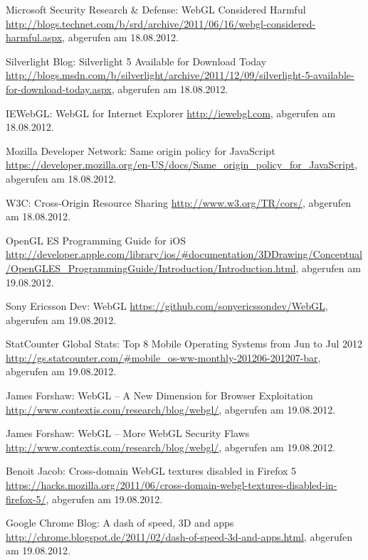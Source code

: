 \begin{thebibliography}{99}
    Microsoft Security Research \& Defense: WebGL Considered Harmful
    \url{http://blogs.technet.com/b/srd/archive/2011/06/16/webgl-considered-harmful.aspx}, abgerufen am 18.08.2012.

    Silverlight Blog: Silverlight 5 Available for Download Today
    \url{http://blogs.msdn.com/b/silverlight/archive/2011/12/09/silverlight-5-available-for-download-today.aspx}, abgerufen am 18.08.2012.

    IEWebGL: WebGL for Internet Explorer
    \url{http://iewebgl.com}, abgerufen am 18.08.2012.

    Mozilla Developer Network: Same origin policy for JavaScript
    \url{https://developer.mozilla.org/en-US/docs/Same_origin_policy_for_JavaScript}, abgerufen am 18.08.2012.

    W3C: Cross-Origin Resource Sharing
    \url{http://www.w3.org/TR/cors/}, abgerufen am 18.08.2012.

    OpenGL ES Programming Guide for iOS
    \url{http://developer.apple.com/library/ios/#documentation/3DDrawing/Conceptual/OpenGLES_ProgrammingGuide/Introduction/Introduction.html}, abgerufen am 19.08.2012.
    
    Sony Ericsson Dev: WebGL
    \url{https://github.com/sonyericssondev/WebGL}, abgerufen am 19.08.2012.
  
    StatCounter Global Stats: Top 8 Mobile Operating Systems from Jun to Jul 2012
    \url{http://gs.statcounter.com/#mobile_os-ww-monthly-201206-201207-bar}, abgerufen am 19.08.2012.


    James Forshaw: WebGL -- A New Dimension for Browser Exploitation
    \url{http://www.contextis.com/research/blog/webgl/}, abgerufen am 19.08.2012.
    
    James Forshaw: WebGL -- More WebGL Security Flaws
    \url{http://www.contextis.com/research/blog/webgl/}, abgerufen am 19.08.2012.

    Benoit Jacob: Cross-domain WebGL textures disabled in Firefox 5
    \url{https://hacks.mozilla.org/2011/06/cross-domain-webgl-textures-disabled-in-firefox-5/}, abgerufen am 19.08.2012.




    Google Chrome Blog: A dash of speed, 3D and apps
    \url{http://chrome.blogspot.de/2011/02/dash-of-speed-3d-and-apps.html}, abgerufen am 19.08.2012.


\end{thebibliography}
